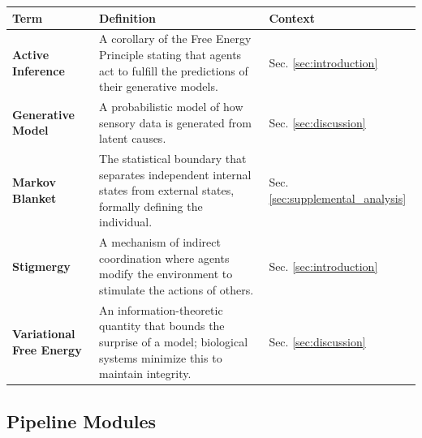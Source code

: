 \documentclass[
]{article}
\newcounter{none} %
\numberwithin{equation}{section}
\begin{document}
{\def\LTcaptype{none} %
\begin{longtable}[]{@{}
  >{\raggedright\arraybackslash}p{}
  >{\raggedright\arraybackslash}p{}
  >{\raggedright\arraybackslash}p{}@{}}
\toprule\noalign{}
\begin{minipage}[b]{\linewidth}\raggedright
Term
\end{minipage} & \begin{minipage}[b]{\linewidth}\raggedright
Definition
\end{minipage} & \begin{minipage}[b]{\linewidth}\raggedright
Context
\end{minipage} \\
\midrule\noalign{}
\endhead
\bottomrule\noalign{}
\endlastfoot
\textbf{Active Inference} & A corollary of the Free Energy Principle
stating that agents act to fulfill the predictions of their generative
models. & Sec. \ref{sec:introduction} \\
\textbf{Generative Model} & A probabilistic model of how sensory data is
generated from latent causes. & Sec. \ref{sec:discussion} \\
\textbf{Markov Blanket} & The statistical boundary that separates
independent internal states from external states, formally defining the
individual. & Sec. \ref{sec:supplemental_analysis} \\
\textbf{Stigmergy} & A mechanism of indirect coordination where agents
modify the environment to stimulate the actions of others. & Sec.
\ref{sec:introduction} \\
\textbf{Variational Free Energy} & An information-theoretic quantity
that bounds the surprise of a model; biological systems minimize this to
maintain integrity. & Sec. \ref{sec:discussion} \\
\end{longtable}
}

\subsection{Pipeline Modules}\label{pipeline-modules}
\end{document}
